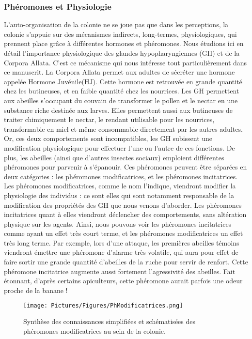 		\subsubsection{Phéromones et Physiologie}
			\label{subsubPhysio}
			L'auto-organisation de la colonie ne se joue pas que dans les perceptions, la colonie s'appuie sur des mécanismes indirects, long-termes, physiologiques, qui prennent place grâce à différentes hormones et phéromones.  Nous étudions ici en détail l'importance physiologique des glandes hypopharyngiennes (GH) et de la Corpora Allata. C'est ce mécanisme qui nous intéresse tout particulièrement dans ce manuscrit. La Corpora Allata permet aux adultes de sécréter une hormone appelée Hormone Juvénile(HJ). Cette hormone est retrouvée en grande quantité chez les butineuses, et en faible quantité chez les nourrices. Les GH permettent aux abeilles s'occupant du couvain de transformer le pollen et le nectar en une substance riche destinée aux larves. Elles permettent aussi aux butineuses de traiter chimiquement le nectar, le rendant utilisable pour les nourrices, transformable en miel et même consommable directement par les autres adultes. Or, ces deux comportements sont incompatibles, les GH subissent une modification physiologique pour effectuer l'une ou l'autre de ces fonctions. De plus, les abeilles (ainsi que d'autres insectes sociaux) emploient différentes phéromones pour parvenir à s'épanouir. Ces phéromones peuvent être séparées en deux catégories : les phéromones modificatrices, et les phéromones incitatrices. Les phéromones modificatrices, comme le nom l'indique, viendront modifier la physiologie des individus : ce sont elles qui sont notamment responsable de la modification des propriétés des GH que nous venons d'aborder. Les phéromones incitatrices quant à elles viendront déclencher des comportements, sans altération physique sur les agents. Ainsi, nous pouvons voir les phéromones incitatrices comme ayant un effet très court terme, et les phéromones modificatrices un effet très long terme. Par exemple, lors d'une attaque, les premières abeilles témoins viendront émettre une phéromone d'alarme très volatile, qui aura pour effet de faire sortir une grande quantité d'abeilles de la ruche pour servir de renfort. Cette phéromone incitatrice augmente aussi fortement l'agressivité des abeilles. Fait étonnant, d'après certains apiculteurs, cette phéromone aurait parfois une odeur proche de la banane !
			
			
			
			
			\begin{figure}
				\texttt{[image: Pictures/Figures/PhModificatrices.png]}
				\caption{Synthèse des connaissances simplifiées et schématisées des phéromones modificatrices au sein de la colonie.}
				\label{phMod}
			\end{figure}	
			
